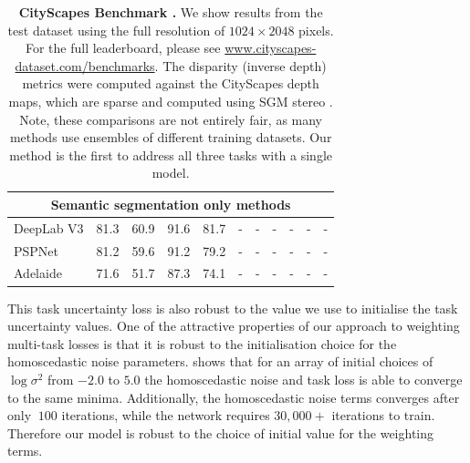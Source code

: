 {\begin{landscape}
\begin{table}[t]
{\begin{tabular}{l|c|c|c|c|c|c|c|c|c|c}
			\multicolumn{11}{c}{\textbf{Semantic segmentation only methods}}\\ \midrule
			DeepLab V3 \citep{chen2017rethinking} & 81.3 & 60.9 & 91.6 & 81.7 &-&-&-&-&-&-\\%
			PSPNet \citep{zhao2017pspnet} & 81.2 & 59.6 & 91.2 & 79.2 &-&-&-&-&-&-\\%
			Adelaide \citep{lin2015efficient} & 71.6 & 51.7 & 87.3 & 74.1 &-&-&-&-&-&-\\%
            \bottomrule
		\end{tabular}}
	\caption[CityScapes Benchmark.]{\textbf{CityScapes Benchmark \citep{Cordts2016Cityscapes}.} We show results from the test dataset using the full resolution of $1024\times2048$ pixels. For the full leaderboard, please see \url{www.cityscapes-dataset.com/benchmarks}. The disparity (inverse depth) metrics were computed against the CityScapes depth maps, which are sparse and computed using SGM stereo \citep{hirschmuller2005accurate}. Note, these comparisons are not entirely fair, as many methods use ensembles of different training datasets. Our method is the first to address all three tasks with a single model.}
	\label{tbl:benchmarks}
\end{table}
\end{landscape}
\clearpage%
}


This task uncertainty loss is also robust to the value we use to initialise the task uncertainty values.
One of the attractive properties of our approach to weighting multi-task losses is that it is robust to the initialisation choice for the homoscedastic noise parameters.  shows that for an array of initial choices of $\log \sigma^2$ from $-2.0$ to $5.0$ the homoscedastic noise and task loss is able to converge to the same minima. Additionally, the homoscedastic noise terms converges after only $~100$ iterations, while the network requires $30,000+$ iterations to train. Therefore our model is robust to the choice of initial value for the weighting terms.

